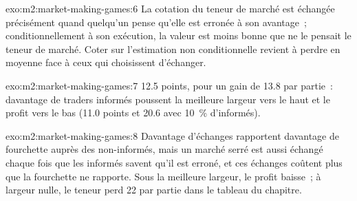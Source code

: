 \begin{solution}{exo:m2:market-making-games:6}
La cotation du teneur de marché est échangée précisément quand quelqu'un pense qu'elle est erronée
à son avantage~; conditionnellement à son exécution, la valeur est moins bonne que ne le pensait le teneur de marché.
Coter sur l'estimation non conditionnelle revient à perdre en moyenne face à ceux qui choisissent d'échanger.
\end{solution}

\begin{solution}{exo:m2:market-making-games:7}
12.5 points, pour un gain de 13.8 par partie~: davantage de traders informés poussent la meilleure largeur vers le haut et le
profit vers le bas (11.0 points et 20.6 avec 10~\% d'informés).
\end{solution}

\begin{solution}{exo:m2:market-making-games:8}
Davantage d'échanges rapportent davantage de fourchette auprès des non-informés, mais un marché serré est aussi échangé
chaque fois que les informés savent qu'il est erroné, et ces échanges coûtent plus que la fourchette
ne rapporte. Sous la meilleure largeur, le profit baisse~; à largeur nulle, le teneur perd 22 par partie dans le
tableau du chapitre.
\end{solution}

